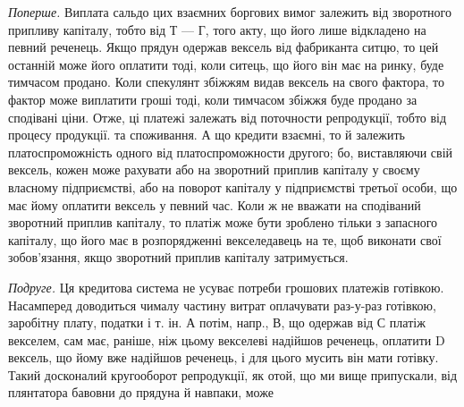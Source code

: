 \emph{Поперше.} Виплата сальдо цих взаємних боргових вимог залежить від
зворотного припливу капіталу, тобто від Т — Г, того акту, що його лише відкладено
на певний реченець. Якщо прядун одержав вексель від фабриканта ситцю,
то цей останній може його оплатити тоді, коли ситець, що його він має на
ринку, буде тимчасом продано. Коли спекулянт збіжжям видав вексель на свого
фактора, то фактор може виплатити гроші тоді, коли тимчасом збіжжя буде продано
за сподівані ціни. Отже, ці платежі залежать від поточности репродукції,
тобто від процесу продукції. та споживання. А що кредити взаємні, то й залежить
платоспроможність одного від платоспроможности другого; бо, виставляючи
свій вексель, кожен може рахувати або на зворотний приплив капіталу у своєму
власному підприємстві, або на поворот капіталу у підприємстві третьої особи,
що має йому оплатити вексель у певний час. Коли ж не вважати на сподіваний
зворотний приплив капіталу, то платіж може бути зроблено тільки з запасного
капіталу, що його має в розпорядженні векселедавець на те, щоб виконати свої
зобов’язання, якщо зворотний приплив капіталу затримується.

\emph{Подруге.} Ця кредитова система не усуває потреби грошових платежів
готівкою. Насамперед доводиться чималу частину витрат оплачувати раз-у-раз
готівкою, заробітну плату, податки і т. ін. А потім, напр., В, що одержав від
С платіж векселем, сам має, раніше, ніж цьому векселеві надійшов реченець,
оплатити D вексель, що йому вже надійшов реченець, і для цього мусить
він мати готівку. Такий досконалий кругооборот репродукції, як отой, що ми
вище припускали, від плянтатора бавовни до прядуна й навпаки, може
\parbreak{}  %

